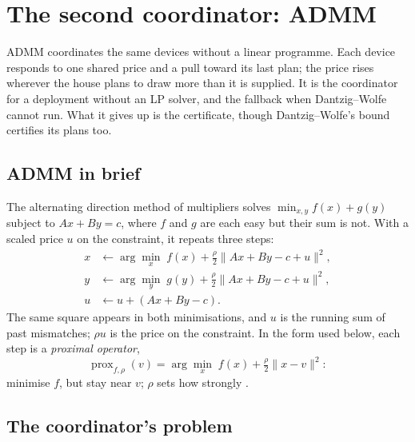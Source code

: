 \documentclass[11pt,a4paper]{article}
\begin{document}
\section{The second coordinator: ADMM}
\label{sec:admm}

ADMM coordinates the same devices without a linear programme. Each device
responds to one shared price and a pull toward its last plan; the price rises
wherever the house plans to draw more than it is supplied. It is the coordinator
for a deployment without an LP solver, and the fallback when Dantzig--Wolfe
cannot run. What it gives up is the certificate, though Dantzig--Wolfe's bound
certifies its plans too.

\subsection{ADMM in brief}

The alternating direction method of multipliers \cite{boyd2011} solves
$\min_{x,y} f(x) + g(y)$ subject to $Ax + By = c$, where $f$ and $g$ are each
easy but their sum is not. With a scaled price $u$ on the constraint, it repeats
three steps:
\begin{equation}
\begin{aligned}
  x &\leftarrow \arg\min_x\; f(x) + \tfrac{\rho}{2}\|Ax + By - c + u\|^2, \\
  y &\leftarrow \arg\min_y\; g(y) + \tfrac{\rho}{2}\|Ax + By - c + u\|^2, \\
  u &\leftarrow u + (Ax + By - c) .
\end{aligned}
\label{eq:admm}
\end{equation}
The same square appears in both minimisations, and $u$ is the running sum of
past mismatches; $\rho u$ is the price on the constraint. In the form used
below, each step is a \emph{proximal operator},
\begin{equation}
  \operatorname{prox}_{f,\rho}(v) = \arg\min_x \; f(x) + \tfrac{\rho}{2}\|x - v\|^2 :
  \label{eq:prox}
\end{equation}
minimise $f$, but stay near $v$; $\rho$ sets how strongly \cite{parikh2014}.

\subsection{The coordinator's problem}
\label{sec:exchange}
\end{document}

